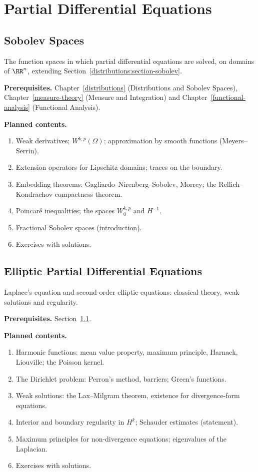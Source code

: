\chapter{Partial Differential Equations}\label{sobolev-spaces}


\section{Sobolev Spaces}\label{sobolev-spaces:section-sobolev-spaces}
The function spaces in which partial differential equations are solved, on domains of $\RR^n$,
extending Section~\ref{distributions:section-sobolev}.

\noindent\textbf{Prerequisites.} Chapter~\ref{distributions} (Distributions and Sobolev Spaces), Chapter~\ref{measure-theory} (Measure and Integration) and Chapter~\ref{functional-analysis} (Functional Analysis).

\noindent\textbf{Planned contents.}
\begin{enumerate}
\item Weak derivatives; $W^{k,p}(\Omega)$; approximation by smooth functions (Meyers--Serrin).
\item Extension operators for Lipschitz domains; traces on the boundary.
\item Embedding theorems: Gagliardo--Nirenberg--Sobolev, Morrey; the Rellich--Kondrachov compactness theorem.
\item Poincar\'e inequalities; the spaces $W^{k,p}_0$ and $H^{-1}$.
\item Fractional Sobolev spaces (introduction).
\item Exercises with solutions.
\end{enumerate}

\section{Elliptic Partial Differential Equations}\label{sobolev-spaces:section-elliptic-pde}
Laplace's equation and second-order elliptic equations: classical theory, weak solutions and
regularity.

\noindent\textbf{Prerequisites.} Section~\ref{sobolev-spaces:section-sobolev-spaces}.

\noindent\textbf{Planned contents.}
\begin{enumerate}
\item Harmonic functions: mean value property, maximum principle, Harnack, Liouville; the Poisson kernel.
\item The Dirichlet problem: Perron's method, barriers; Green's functions.
\item Weak solutions: the Lax--Milgram theorem, existence for divergence-form equations.
\item Interior and boundary regularity in $H^k$; Schauder estimates (statement).
\item Maximum principles for non-divergence equations; eigenvalues of the Laplacian.
\item Exercises with solutions.
\end{enumerate}

